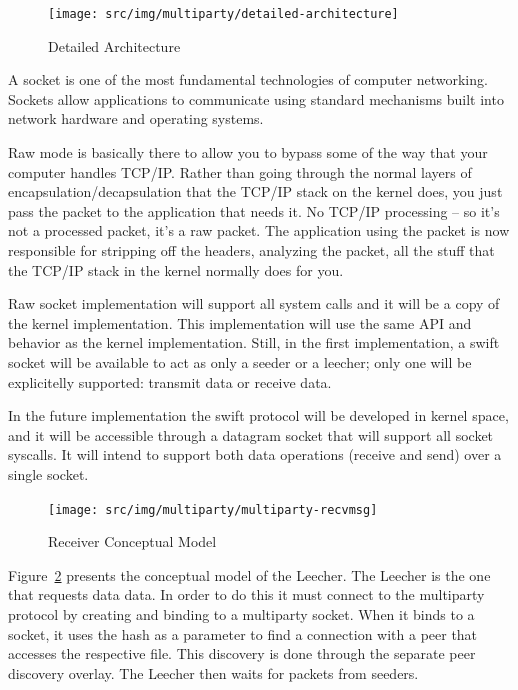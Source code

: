 \begin{figure}
  \centering
  \texttt{[image: src/img/multiparty/detailed-architecture]}
  \caption{Detailed Architecture}
  \label{fig:multiparty:detailed-architecture}
\end{figure}

A socket is one of the most fundamental technologies of computer networking.
Sockets allow applications to communicate using standard mechanisms built into
network hardware and operating systems.

Raw mode is basically there to allow you to bypass some of the way that your
computer handles TCP/IP. Rather than going through the normal layers of
encapsulation/decapsulation that the TCP/IP stack on the kernel does, you just
pass the packet to the application that needs it. No TCP/IP processing -- so
it's not a processed packet, it's a raw packet. The application using
the packet is now responsible for stripping off the headers, analyzing the
packet, all the stuff that the TCP/IP stack in the kernel normally does for
you.

Raw socket implementation will support all system calls and it will be a copy of
the kernel implementation. This implementation will use the same API and
behavior as the kernel implementation. Still, in the first implementation, a
swift socket will be available to act as only a seeder or a leecher;
only one will be explicitelly supported: transmit data or receive data.

In the future implementation the swift protocol will be developed in kernel
space, and it will be accessible through a datagram socket that will support
all socket syscalls. It will intend to support both data operations (receive
and send) over a single socket.

\begin{figure}
  \centering
  \texttt{[image: src/img/multiparty/multiparty-recvmsg]}
  \caption{Receiver Conceptual Model}
  \label{fig:multiparty:multiparty-recvmsg}
\end{figure}

Figure~\ref{fig:multiparty:multiparty-recvmsg} presents the conceptual model
of the Leecher. The Leecher is the one that requests data data. In order
to do this it must connect to the multiparty protocol by creating and binding
to a multiparty socket. When it binds to a socket, it uses the hash as a
parameter to find a connection with a peer that accesses the respective file.
This discovery is done through the separate peer discovery overlay. The
Leecher then waits for packets from seeders.

